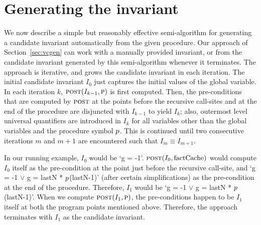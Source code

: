 \section{Generating the invariant}
\label{sec:invariant}

We now describe a simple but reasonably effective semi-algorithm for
generating a candidate invariant automatically from the given
procedure. Our approach of Section~\ref{sec:vcgen} can work with a manually
provided invariant, or from the candidate invariant generated by this
semi-algorithm whenever it terminates. The approach is iterative, and
grows the candidate invariant in each iteration. The initial candidate
invariant $I_0$ just captures the initial values of the global variable. In
each iteration $k$, $\textsc{post}(I_{k-1}, \textsc{p})$ is first computed. Then, the
pre-conditions that are computed by $\textsc{post}$ at the points before the
recursive call-sites and at the end of the procedure are disjuncted with
$I_{k-1}$ to yield $I_k$; also, outermost level universal quantifiers are
introduced in $I_k$ for all variables other than the global variables and
the procedure symbol $p$.  This is continued until two consecutive
iterations $m$ and $m+1$ are encountered such that $I_m \equiv I_{m+1}$.

In our running example, $I_0$ would be `g = -1'. $\textsc{post}(I_0,
\mathrm{factCache})$ would compute $I_0$ itself as the pre-condition at the
point just before the recursive call-site, and `g = -1 $\vee$ g = lastN *
$p$(lastN-1)' (after certain simplifications) as the pre-condition
at the end of the
procedure. Therefore, $I_1$ would be `g = -1 $\vee$ g = lastN *
$p$(lastN-1)'. When we compute $\textsc{post}(I_1, \textsc{p})$, the
pre-conditions happen to be $I_1$ itself at both the program points
mentioned above. Therefore, the approach terminates with $I_1$ as the
candidate invariant.

